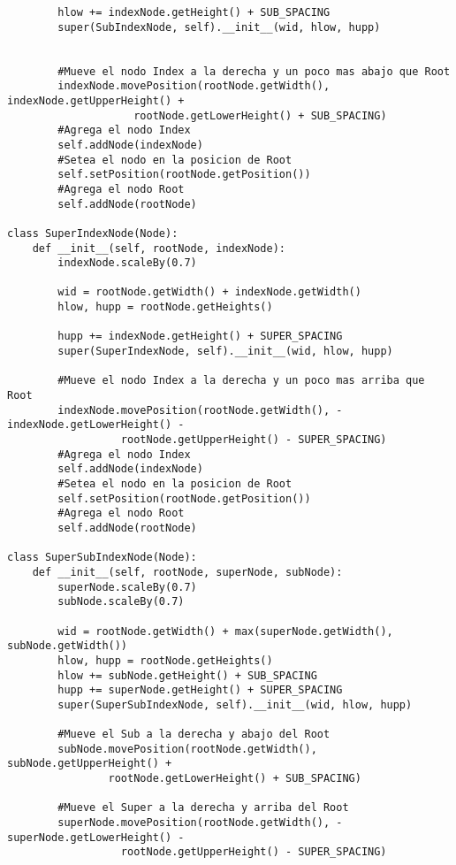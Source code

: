 \begin{verbatim}
        hlow += indexNode.getHeight() + SUB_SPACING
        super(SubIndexNode, self).__init__(wid, hlow, hupp)


        #Mueve el nodo Index a la derecha y un poco mas abajo que Root
        indexNode.movePosition(rootNode.getWidth(), indexNode.getUpperHeight() + 
        			rootNode.getLowerHeight() + SUB_SPACING)
        #Agrega el nodo Index
        self.addNode(indexNode)
        #Setea el nodo en la posicion de Root                             
        self.setPosition(rootNode.getPosition())
        #Agrega el nodo Root            
        self.addNode(rootNode)                              

class SuperIndexNode(Node):
    def __init__(self, rootNode, indexNode):
        indexNode.scaleBy(0.7)

        wid = rootNode.getWidth() + indexNode.getWidth()
        hlow, hupp = rootNode.getHeights()

        hupp += indexNode.getHeight() + SUPER_SPACING
        super(SuperIndexNode, self).__init__(wid, hlow, hupp)
        
        #Mueve el nodo Index a la derecha y un poco mas arriba que Root
        indexNode.movePosition(rootNode.getWidth(), -indexNode.getLowerHeight() - 
                  rootNode.getUpperHeight() - SUPER_SPACING)
        #Agrega el nodo Index
        self.addNode(indexNode)
        #Setea el nodo en la posicion de Root                             
        self.setPosition(rootNode.getPosition())
        #Agrega el nodo Root            
        self.addNode(rootNode)                              

class SuperSubIndexNode(Node):
    def __init__(self, rootNode, superNode, subNode):
        superNode.scaleBy(0.7)
        subNode.scaleBy(0.7)

        wid = rootNode.getWidth() + max(superNode.getWidth(), subNode.getWidth())
        hlow, hupp = rootNode.getHeights()
        hlow += subNode.getHeight() + SUB_SPACING
        hupp += superNode.getHeight() + SUPER_SPACING
        super(SuperSubIndexNode, self).__init__(wid, hlow, hupp)

        #Mueve el Sub a la derecha y abajo del Root
        subNode.movePosition(rootNode.getWidth(), subNode.getUpperHeight() + 
                rootNode.getLowerHeight() + SUB_SPACING)
        
        #Mueve el Super a la derecha y arriba del Root
        superNode.movePosition(rootNode.getWidth(), -superNode.getLowerHeight() - 
                  rootNode.getUpperHeight() - SUPER_SPACING)


\end{verbatim}
